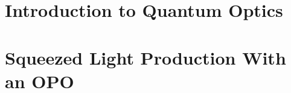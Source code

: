 \documentclass[a4paper,epsfig,12pt,twoside,openright]{brahim}
\begin{document}
 \pagestyle{fancy}                       %
   \fancyfoot{}                            %
   \renewcommand{\chaptermark}[1]{         %
     \markboth{\chaptername\ \thechapter.\ #1}{}} %
   \renewcommand{\sectionmark}[1]{         %
     \markright{\thesection.\ #1}}         %
   \fancyhead[LE,RO]{\thepage}    %
   \fancyhead[RE]{\leftmark}      %
   \fancyhead[LO]{\rightmark}     %
   \renewcommand{\headrulewidth}{0.2pt}    %


\setcounter{totalnumber}{4}
\renewcommand{\textfraction}{.2}
\renewcommand{\floatpagefraction}{0.7}

\dominitoc 
\frontmatter 


\setlength{\textwidth}{155mm} 
\setlength{\oddsidemargin}{-1mm}
\setlength{\textheight}{208mm}
\setlength{\parindent}{0.25in}
 

\newpage
\thispagestyle{empty}
\newpage
\null
\cleardoublepage

\setlength{\textwidth}{155mm}  
\setlength{\oddsidemargin}{5mm}
\setlength{\textheight}{208mm}
\setlength{\evensidemargin}{0mm}



\pagestyle{fancy}

\tableofcontents

\cleardoublepage
{}  
{}
\listoffigures
\mainmatter
 

\part{Introduction to Quantum Optics}
\label{part:1} 


\part{Squeezed Light Production With an OPO}
\label{part:2}   





\end{document}
